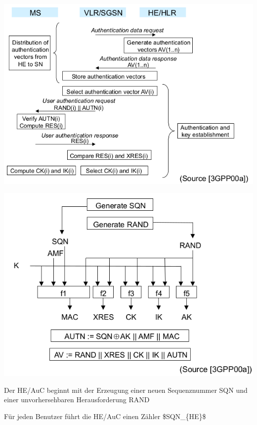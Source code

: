 \documentclass[a4paper]{article}
\begin{document}
\begin{multicols}{3}
      \begin{itemize*}
            \item \includegraphics[width=\linewidth]{Assets/NetworkSecurity-umts-authentication-mechanism.png}
            \item \includegraphics[width=\linewidth]{Assets/NetworkSecurity-umts-authentication-vectors.png}
            \begin{itemize*}
                  \item Der HE/AuC beginnt mit der Erzeugung einer neuen Sequenznummer SQN und einer unvorhersehbaren Herausforderung RAND
                  \begin{itemize*} \item Für jeden Benutzer führt die HE/AuC einen Zähler \$SQN\_\{HE\}\$ \end{itemize*}

\end{itemize*}
\end{itemize*}
\end{multicols}
\end{document}
